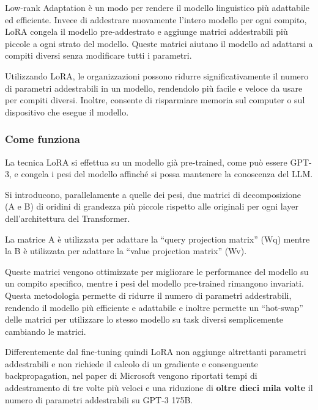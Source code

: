 Low-rank Adaptation \cite{LoRA} è un modo per rendere il modello linguistico più adattabile ed efficiente. Invece di addestrare nuovamente l'intero modello per ogni compito, LoRA congela il modello pre-addestrato e aggiunge matrici addestrabili più piccole a ogni strato del modello. Queste matrici aiutano il modello ad adattarsi a compiti diversi senza modificare tutti i parametri.

Utilizzando LoRA, le organizzazioni possono ridurre significativamente il numero di parametri addestrabili in un modello, rendendolo più facile e veloce da usare per compiti diversi. Inoltre, consente di risparmiare memoria sul computer o sul dispositivo che esegue il modello.

\subsubsection{Come funziona}

La tecnica LoRA si effettua su un modello già pre-trained, come può essere GPT-3, e congela i pesi del modello affinché si possa mantenere la conoscenza del LLM.

Si introducono, parallelamente a quelle dei pesi, due matrici di decomposizione (A e B) di oridini di grandezza più piccole rispetto alle originali per ogni layer dell'architettura del Transformer.

La matrice A è utilizzata per adattare la ``query projection matrix'' (Wq) mentre la B è utilizzata per adattare la ``value projection matrix'' (Wv).

Queste matrici vengono ottimizzate per migliorare le performance del modello su un compito specifico, mentre i pesi del modello pre-trained rimangono invariati.
Questa metodologia permette di ridurre il numero di parametri addestrabili, rendendo il modello più efficiente e adattabile e inoltre permette un ``hot-swap'' delle matrici per utilizzare lo stesso modello su task diversi semplicemente cambiando le matrici.

Differentemente dal fine-tuning quindi LoRA non aggiunge altrettanti parametri addestrabili e non richiede il calcolo di un gradiente e consenguente backpropagation, nel paper di Microsoft \cite{LoRA} vengono riportati tempi di addestramento di tre volte più veloci e una riduzione di \textbf{oltre dieci mila volte} il numero di parametri addestrabili su GPT-3 175B.